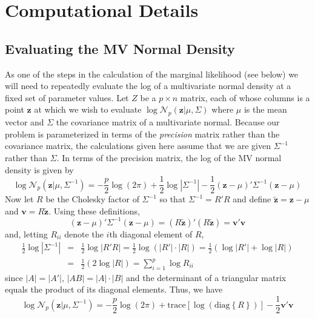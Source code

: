 \documentclass[12pt]{article}
\begin{document}
\section{Computational Details}

\subsection{Evaluating the MV Normal Density}
As one of the steps in the calculation of the marginal likelihood (see below) we will need to repeatedly evaluate the log of a multivariate normal density at a fixed set of parameter values.
Let $Z$ be a $p\times n$ matrix, each of whose columns is a point $\mathbf{z}$ at which we wish to evaluate 
$\log {\mathcal{N}_p\left(\mathbf{z}|\mu, \Sigma \right)}$
where $\mu$ is the mean vector and $\Sigma$ the covariance matrix of a multivariate normal.
Because our problem is parameterized in terms of the \emph{precision} matrix rather than the covariance matrix, the calculations given here assume that we are given $\Sigma^{-1}$ rather than $\Sigma$.
In terms of the precision matrix, the log of the MV normal density is given by
\begin{equation*}
  \log {\mathcal{N}_p\left(\mathbf{z}|\mu, \Sigma^{-1} \right)} = -\frac{p}{2}\log\left( 2\pi \right) + \frac{1}{2} \log \left| \Sigma^{-1} \right| - \frac{1}{2} \left(\mathbf{z} - \mu \right)' \Sigma^{-1} \left( \mathbf{z} - \mu \right)
\end{equation*}
Now let $R$ be the Cholesky factor of $\Sigma^{-1}$ so that $\Sigma^{-1} = R'R$ and define $\tilde{\mathbf{z}} = \mathbf{z} - \mu$ and $\mathbf{v} = R\tilde{\mathbf{z}}$.
Using these definitions,
\begin{equation*}
  \left( \mathbf{z} - \mu \right)' \Sigma^{-1} \left( \mathbf{z} - \mu \right) = (R\tilde{\mathbf{z}})'(R\tilde{\mathbf{z}}) = \mathbf{v}' \mathbf{v}
\end{equation*}
and, letting $R_{ii}$ denote the $i$th diagonal element of $R$,
\begin{eqnarray*}
  \frac{1}{2}\log |\Sigma^{-1}| &=&  \frac{1}{2}\log |R'R| = \frac{1}{2}\log\left(|R'| \cdot |R|\right) = \frac{1}{2}\left(\log |R'| + \log |R| \right)\\
  &=&\frac{1}{2}\left( 2 \log|R|\right)=  \sum_{i=1}^{p} \log R_{ii}
\end{eqnarray*} 
since $|A| = |A'|$, $|AB| = |A| \cdot |B|$ and the determinant of a triangular matrix equals the product of its diagonal elements.
Thus, we have
\begin{equation*}
  \log {\mathcal{N}_p\left(\mathbf{z}|\mu, \Sigma^{-1} \right)} = -\frac{p}{2}\log\left( 2\pi \right) + \mbox{trace}\left[\log \left(\mbox{diag}\left\{R  \right\}  \right)\right] - \frac{1}{2} \mathbf{v}'\mathbf{v}
\end{equation*}
\end{document}

